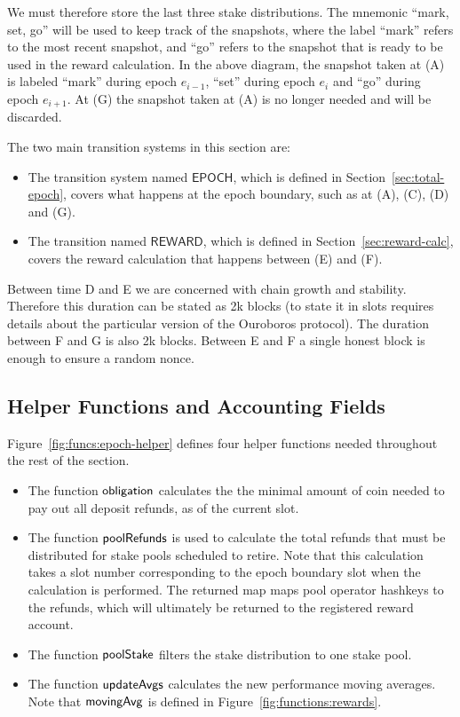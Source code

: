 We must therefore store the last three stake distributions.
The mnemonic ``mark, set, go'' will be used to keep
track of the snapshots, where the label ``mark'' refers to the most recent snapshot,
and ``go'' refers to the snapshot that is ready to be used in the reward calculation.
In the above diagram, the snapshot taken at (A) is labeled ``mark'' during epoch $e_{i-1}$,
``set'' during epoch $e_i$ and ``go'' during epoch $e_{i+1}$. At (G) the snapshot
taken at (A) is no longer needed and will be discarded.

The two main transition systems in this section are:
\begin{itemize}
  \item The transition system named $\mathsf{EPOCH}$, which is defined in
    Section~\ref{sec:total-epoch}, covers what happens at the epoch boundary,
    such as at (A), (C), (D) and (G).
  \item The transition named $\mathsf{REWARD}$, which is defined in Section~\ref{sec:reward-calc},
    covers the reward calculation that happens between (E) and (F).
\end{itemize}


\begin{note}
  Between time D and E we are concerned with chain growth and stability.
  Therefore this duration can be stated as 2k blocks (to state it in slots requires details about
  the particular version of the Ouroboros protocol). The duration between F and G is also 2k blocks.
  Between E and F a single honest block is enough to ensure a random nonce.
\end{note}

\subsection{Helper Functions and Accounting Fields}
\label{sec:stake-dist-helpers}

Figure~\ref{fig:funcs:epoch-helper} defines four helper functions needed
throughout the rest of the section.

\begin{itemize}
  \item The function $\mathsf{obligation}$ calculates the the minimal amount of coin needed to
    pay out all deposit refunds, as of the current slot.
  \item The function $\mathsf{poolRefunds}$ is used to calculate the total refunds
    that must be distributed for stake pools scheduled to retire.
    Note that this calculation takes a slot number corresponding to the epoch boundary slot
    when the calculation is performed.  The returned map maps pool operator hashkeys to the
    refunds, which will ultimately be returned to the registered reward account.
  \item The function $\mathsf{poolStake}$ filters the stake distribution to one stake pool.
  \item The function $\mathsf{updateAvgs}$ calculates the new performance moving averages.
    Note that $\mathsf{movingAvg}$ is defined in Figure~\ref{fig:functions:rewards}.
\end{itemize}


